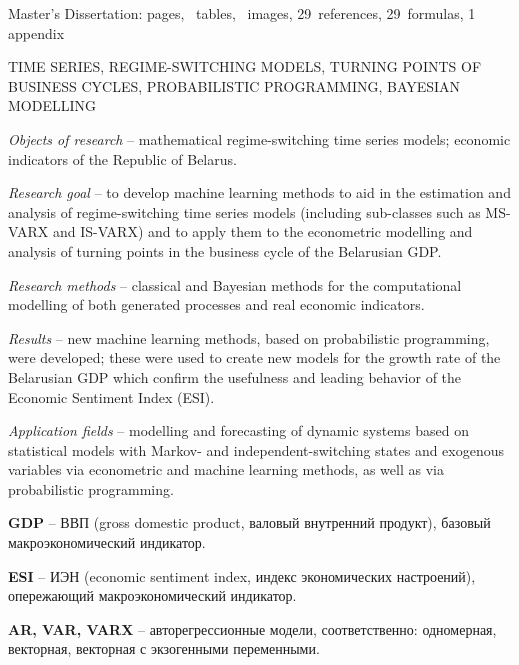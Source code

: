 \documentclass[a4paper,14pt]{extreport}
\newcommand{\totalreferences}{29}
\newcommand{\totalformulas}{29}
\begin{document}

Master's Dissertation: \pageref{LastPage} pages, \totaltables\ tables, \totalfigures\ images, \totalreferences\ references, \totalformulas\ formulas, 1 appendix

\MakeUppercase{time series, regime-switching models, turning points of business cycles, probabilistic programming, Bayesian modelling}

\textit{Objects of research} -- mathematical regime-switching time series models; economic indicators of the Republic of Belarus.

\textit{Research goal} -- to develop machine learning methods to aid in the estimation and analysis of regime-switching time series models (including sub-classes such as MS-VARX and IS-VARX) and to apply them to the econometric modelling and analysis of turning points in the business cycle of the Belarusian GDP.

\textit{Research methods} -- classical and Bayesian methods for the computational modelling of both generated processes and real economic indicators.

\textit{Results} -- new machine learning methods, based on probabilistic programming, were developed; these were used to create new models for the growth rate of the Belarusian GDP which confirm the usefulness and leading behavior of the Economic Sentiment Index (ESI).

\textit{Application fields} -- modelling and forecasting of dynamic systems based on statistical models with Markov- and independent-switching states and exogenous variables via econometric and machine learning methods, as well as via probabilistic programming.




\clearpage
\renewcommand{\contentsname}{Содержание}
\tableofcontents



\textbf{GDP} -- ВВП (gross domestic product, валовый внутренний продукт), базовый макроэкономический индикатор.

\textbf{ESI} -- ИЭН (economic sentiment index, индекс экономических настроений), опережающий макроэкономический индикатор.

\textbf{AR, VAR, VARX} -- авторегрессионные модели, соответственно: одномерная, векторная, векторная с экзогенными переменными.
\end{document}
